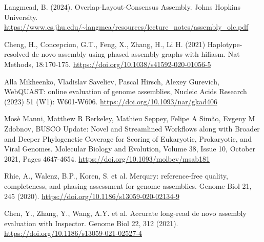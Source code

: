 \documentclass[12pt]{article}
\begin{document}
\begin{thebibliography}{9}
Langmead, B. (2024). Overlap-Layout-Consensus Assembly. Johns Hopkins University. 
\url{https://www.cs.jhu.edu/~langmea/resources/lecture_notes/assembly_olc.pdf}

Cheng, H., Concepcion, G.T., Feng, X., Zhang, H., Li H. (2021) Haplotype-resolved de novo assembly using phased assembly graphs with hifiasm. 
Nat Methods, 18:170-175. \url{https://doi.org/10.1038/s41592-020-01056-5}

Alla Mikheenko, Vladislav Saveliev, Pascal Hirsch, Alexey Gurevich,
WebQUAST: online evaluation of genome assemblies,
Nucleic Acids Research (2023) 51 (W1): W601-W606. \url{https://doi.org/10.1093/nar/gkad406}

Mosè Manni, Matthew R Berkeley, Mathieu Seppey, Felipe A Simão, Evgeny M Zdobnov, 
BUSCO Update: Novel and Streamlined Workflows along with Broader and Deeper Phylogenetic Coverage for Scoring of Eukaryotic, Prokaryotic, and Viral Genomes. 
Molecular Biology and Evolution, Volume 38, Issue 10, October 2021, Pages 4647-4654. \url{https://doi.org/10.1093/molbev/msab181}

Rhie, A., Walenz, B.P., Koren, S. et al. Merqury: reference-free quality, completeness, and phasing assessment for genome assemblies.
 Genome Biol 21, 245 (2020). \url{https://doi.org/10.1186/s13059-020-02134-9}

Chen, Y., Zhang, Y., Wang, A.Y. et al. Accurate long-read de novo assembly evaluation with Inspector.
Genome Biol 22, 312 (2021). \url{https://doi.org/10.1186/s13059-021-02527-4}

\end{thebibliography}
\end{document}
